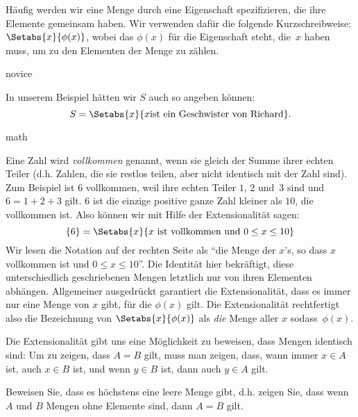 \documentclass[../../../include/open-logic-section]{subfiles}
\begin{document}
Häufig werden wir eine Menge durch eine Eigenschaft spezifizieren, die ihre Elemente
gemeinsam haben. Wir verwenden dafür die folgende Kurzschreibweise:
$\Setabs{x}{\phi(x)}$, wobei das $\phi(x)$ für die Eigenschaft steht,
die~$x$ haben muss, um zu den Elementen der Menge zu zählen.

\begin{tagblock}{novice}
\begin{ex}
In unserem Beispiel hätten wir $S$ auch so angeben können:
\[
S = \Setabs{x}{x \text{ist ein Geschwister von Richard}}.
\]
\end{ex}
\end{tagblock}

\begin{tagblock}{math}
\begin{ex}
Eine Zahl wird \emph{vollkommen} genannt, wenn sie gleich der Summe ihrer
echten Teiler (d.h. Zahlen, die sie restlos teilen, aber nicht
identisch mit der Zahl sind). Zum Beispiel ist $6$ vollkommen, weil ihre
echten Teiler $1$, $2$ und~$3$ sind und $6 = 1 + 2 + 3$ gilt. $6$ ist die einzige positive ganze Zahl kleiner als $10$, die vollkommen ist. Also
können wir mit Hilfe der Extensionalität sagen:
\[
	\{6\} = \Setabs{x}{x\text{ ist vollkommen und }0 \leq x \leq 10}
\]
Wir lesen die Notation auf der rechten Seite als ``die Menge der $x$'s, so dass $x$
vollkommen ist und $0 \leq x \leq 10$''. Die Identität hier bekräftigt, diese unterschiedlich 
geschriebenen Mengen letztlich nur von ihren Elementen abhängen.
Allgemeiner ausgedrückt garantiert die Extensionalität, dass es immer
nur eine Menge von $x$ gibt, für die $\phi(x)$ gilt.
Die Extensionalität rechtfertigt also die Bezeichnung von 
$\Setabs{x}{\phi(x)}$ als \emph{die} Menge aller $x$ sodass~$\phi(x)$.
\end{ex}
\end{tagblock}

Die Extensionalität gibt uns eine Möglichkeit zu beweisen, dass Mengen identisch sind: Um zu zeigen, dass $A = B$ gilt, muss man zeigen, dass, wann immer $x \in A$ ist, auch $x \in B$ ist,
und wenn $y \in B$ ist, dann auch $y \in A$ gilt.

\begin{prob}
Beweisen Sie, dass es höchstens eine leere Menge gibt, d.h. zeigen Sie, dass wenn $A$ und $B$
Mengen ohne Elemente sind, dann $A = B$ gilt.
\end{prob}
\end{document}
